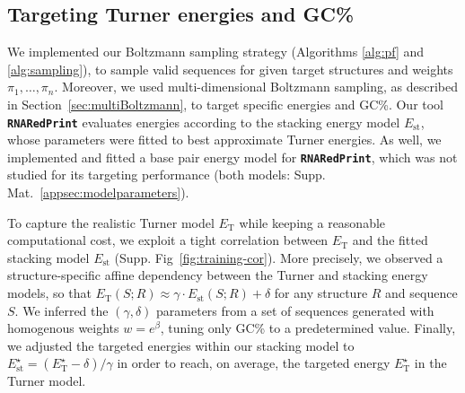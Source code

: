 \documentclass{bioinfo}
\newcommand{\Nuc}[1]{{\sf #1}}
\newcommand{\Cb}{\Nuc{C}}
\newcommand{\Gb}{\Nuc{G}}
\newcommand{\GCb}{\Gb\Cb}
\newcommand{\ourprog}{{\tt \bfseries{}\color{black!85}RNA\textcolor{red!70!black}{Red}Print}}
\newcommand{\EnergyTurner}{E_{\text{T}}}
\newcommand{\EnergyStacking}{E_{\text{st}}}
\begin{document}
\subsection{Targeting Turner energies and \GCb\%}
We implemented our Boltzmann sampling strategy (Algorithms
\ref{alg:pf} and \ref{alg:sampling}), to sample valid sequences for
given target structures and weights $\pi_1,\dots,\pi_n$.  Moreover, we
used multi-dimensional Boltzmann sampling, as described in
Section~\ref{sec:multiBoltzmann}, to target specific energies and
\GCb\%.  Our tool \ourprog{} evaluates energies according to the
stacking energy model $\EnergyStacking$, whose parameters were fitted
to best approximate Turner energies. As well, we implemented and
fitted a base pair energy model for \ourprog{}, which was not studied
for its targeting performance (both models:
Supp. Mat.~\ref{appsec:modelparameters}).
%
%

To capture the realistic Turner model $\EnergyTurner$ while keeping
a reasonable computational cost, we exploit a tight correlation between
$\EnergyTurner$ and the fitted stacking model $\EnergyStacking$
(Supp. Fig~\ref{fig:training-cor}). More precisely, we observed a
structure-specific affine dependency between the Turner and stacking
energy models, so that
$\EnergyTurner(S;R) \approx \gamma\cdot \EnergyStacking(S;R) + \delta$
for any structure $R$ and sequence $S$. We inferred the
$(\gamma,\delta)$ parameters from a set of sequences generated with
homogenous weights $w=e^{\beta}$, tuning only \GCb\% to a
predetermined value.  Finally, we adjusted the targeted energies
within our stacking model to
$\EnergyStacking^{\star} = (\EnergyTurner^{\star}- \delta)/\gamma$ in
order to reach, on average, the targeted energy
$\EnergyTurner^{\star}$ in the Turner model.
\end{document}

